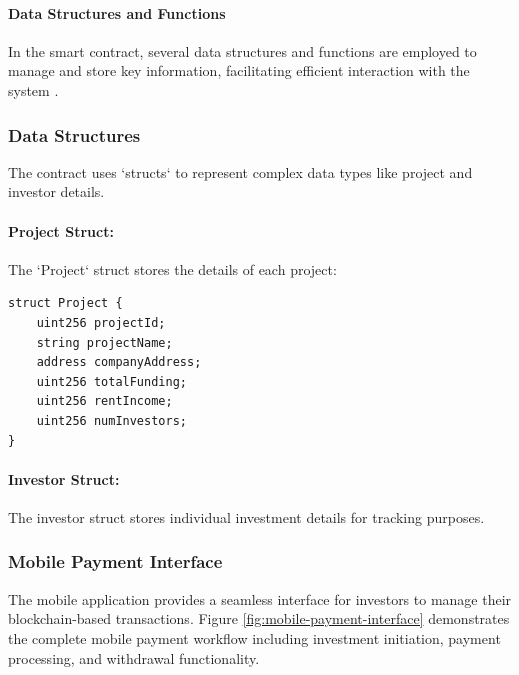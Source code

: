 \paragraph{Data Structures and Functions}

In the smart contract, several data structures and functions are employed to manage and store key information, facilitating efficient interaction with the system \cite{Dannen2017SoliditySmartContracts}.

\subsubsection{Data Structures}

The contract uses `structs` to represent complex data types like project and investor details.

\paragraph{Project Struct:}
The `Project` struct stores the details of each project:
\begin{verbatim}
struct Project {
    uint256 projectId;
    string projectName;
    address companyAddress;
    uint256 totalFunding;
    uint256 rentIncome;
    uint256 numInvestors;
}
\end{verbatim}

\paragraph{Investor Struct:}
The investor struct stores individual investment details for tracking purposes.

\subsubsection*{Mobile Payment Interface}

The mobile application provides a seamless interface for investors to manage their blockchain-based transactions. Figure \ref{fig:mobile-payment-interface} demonstrates the complete mobile payment workflow including investment initiation, payment processing, and withdrawal functionality.

